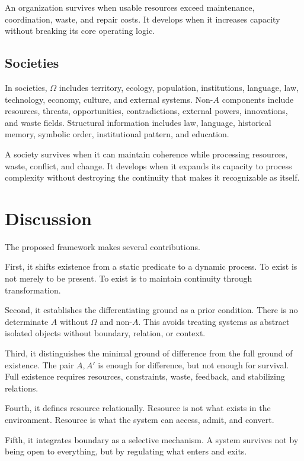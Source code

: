 \documentclass[11pt,a4paper]{article}
\begin{document}
An organization survives when usable resources exceed maintenance, coordination, waste, and repair costs. It develops when it increases capacity without breaking its core operating logic.

\subsection{Societies}

In societies, $\Omega$ includes territory, ecology, population, institutions, language, law, technology, economy, culture, and external systems. Non-$A$ components include resources, threats, opportunities, contradictions, external powers, innovations, and waste fields. Structural information includes law, language, historical memory, symbolic order, institutional pattern, and education.

A society survives when it can maintain coherence while processing resources, waste, conflict, and change. It develops when it expands its capacity to process complexity without destroying the continuity that makes it recognizable as itself.

\section{Discussion}

The proposed framework makes several contributions.

First, it shifts existence from a static predicate to a dynamic process. To exist is not merely to be present. To exist is to maintain continuity through transformation.

Second, it establishes the differentiating ground as a prior condition. There is no determinate $A$ without $\Omega$ and non-$A$. This avoids treating systems as abstract isolated objects without boundary, relation, or context.

Third, it distinguishes the minimal ground of difference from the full ground of existence. The pair ${A,A'}$ is enough for difference, but not enough for survival. Full existence requires resources, constraints, waste, feedback, and stabilizing relations.

Fourth, it defines resource relationally. Resource is not what exists in the environment. Resource is what the system can access, admit, and convert.

Fifth, it integrates boundary as a selective mechanism. A system survives not by being open to everything, but by regulating what enters and exits.
\end{document}
